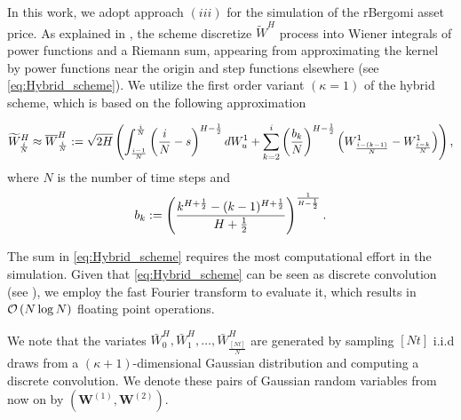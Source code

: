 In this work, we adopt approach  $(iii)$ for the simulation of the rBergomi asset price. As explained in \cite{bennedsen2017hybrid}, the scheme discretize $\widetilde{W}^H$ process into Wiener integrals of power functions and a Riemann sum, appearing from approximating the kernel by power functions near the origin and step functions elsewhere (see \eqref{eq:Hybrid_scheme}). We utilize the first order variant $(\kappa=1) $ of the hybrid scheme, which is based on the following approximation

\begin{equation}\label{eq:Hybrid_scheme}
\widetilde{W}^H_{\frac{i}{N}} \approx \overline{W}^H_{\frac{i}{N}}:= \sqrt{2H} \left(\int_{\frac{i-1}{N}}^{\frac{i}{N}} \left(\frac{i}{N} -s\right)^{H-\frac{1}{2}} dW_u^1+\sum_{k=2}^{i} \left(\frac{b_k}{N}\right)^{H-\frac{1}{2}} \left(W_{\frac{i-(k-1)}{N}}^1-W_{\frac{i-k}{N}}^1\right)\right) ,
\end{equation}
where $N$ is the number of time steps and 
$$ b_k:=\left(\frac{k^{H+\frac{1}{2}}-(k-1)^{H+\frac{1}{2} }}{H+\frac{1}{2}}\right)^{\frac{1}{H-\frac{1}{2}}} .$$

The sum in \eqref{eq:Hybrid_scheme} requires the most computational effort in the simulation. Given that \eqref{eq:Hybrid_scheme} can be seen as discrete convolution  (see \cite{bennedsen2017hybrid}), we employ the fast Fourier transform to evaluate it, which results in  ${\mathcal{O}}\left(N \log N\right)$ floating point operations.


We note that the variates $\bar{W}_0^{H},\bar{W}_1^{H},\dots,\bar{W}_{\frac{[Nt]}{N}}^{H}$ are  generated by sampling $[Nt]$ i.i.d draws from a $(\kappa+1)$-dimensional Gaussian distribution and computing a discrete convolution. We denote these pairs  of Gaussian random variables from now on by $(\mathbf{W}^{(1)},\mathbf{W}^{(2)})$.
